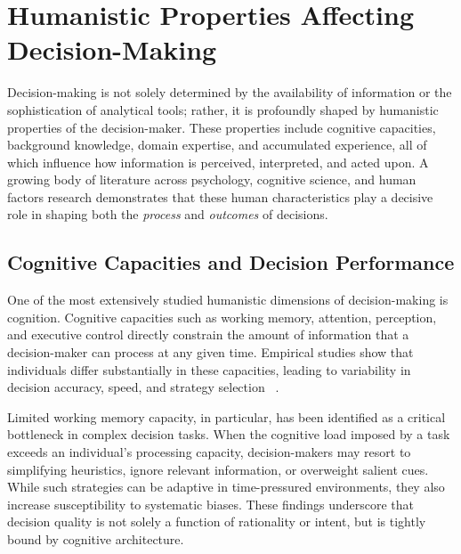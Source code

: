 \documentclass{sfuthesis}
\begin{document}
\section{Humanistic Properties Affecting Decision-Making}
Decision-making is not solely determined by the availability of information or the sophistication of analytical tools; rather, it is profoundly shaped by humanistic properties of the decision-maker. These properties include cognitive capacities, background knowledge, domain expertise, and accumulated experience, all of which influence how information is perceived, interpreted, and acted upon. A growing body of literature across psychology, cognitive science, and human factors research demonstrates that these human characteristics play a decisive role in shaping both the \textit{process} and \textit{outcomes} of decisions.
\subsection{Cognitive Capacities and Decision Performance}
One of the most extensively studied humanistic dimensions of decision-making is cognition. Cognitive capacities such as working memory, attention, perception, and executive control directly constrain the amount of information that a decision-maker can process at any given time. Empirical studies show that individuals differ substantially in these capacities, leading to variability in decision accuracy, speed, and strategy selection ~\cite{tenenbaum_relationship_1993}.\par
Limited working memory capacity, in particular, has been identified as a critical bottleneck in complex decision tasks. When the cognitive load imposed by a task exceeds an individual’s processing capacity, decision-makers may resort to simplifying heuristics, ignore relevant information, or overweight salient cues. While such strategies can be adaptive in time-pressured environments, they also increase susceptibility to systematic biases. These findings underscore that decision quality is not solely a function of rationality or intent, but is tightly bound by cognitive architecture.
\end{document}
